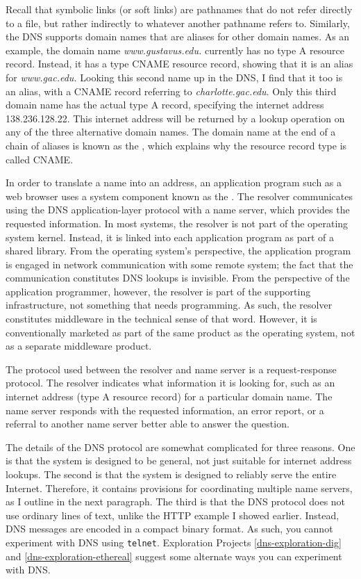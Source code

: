 Recall that symbolic links (or soft links) are pathnames that do not
refer directly to a file, but rather indirectly to whatever another
pathname refers to.  Similarly, the DNS supports domain names that are
aliases for other domain names.  As an example, the domain name
\textit{www.gustavus.edu.} currently has no type A resource record.
Instead, it has a type CNAME resource record, showing that it is an
alias for \textit{www.gac.edu.}  Looking this second name up in the DNS,
I find that it too is an alias, with a CNAME record referring to
\textit{charlotte.gac.edu}.  Only this third domain name has the actual
type A record, specifying the internet address 138.236.128.22.
This internet address will be returned by a lookup operation on any of
the three alternative domain names.  The domain name at the end of a
chain of aliases is known as the ,
which explains why the resource record type is called CNAME.

In order to translate a name into an address, an application program
such as a web browser uses a system component known as the .
The resolver communicates using the DNS application-layer protocol
with a name server, which provides the requested information.  In most
systems, the resolver is not part of the operating system kernel.
Instead, it is linked into each application program as part of a
shared library.  From the operating system's perspective, the
application program is engaged in network communication with some
remote system; the fact that the communication constitutes DNS lookups
is invisible.  From the perspective of the application programmer,
however, the resolver is part of the supporting infrastructure, not
something that needs programming.  As such, the resolver constitutes
middleware in the technical sense of that word.  However, it is
conventionally marketed as part of the same product as the operating
system, not as a separate middleware product.

The protocol used between the resolver and name server is a
request-response protocol.  The resolver indicates what information it
is looking for, such as an internet address (type A resource record)
for a particular domain name.  The name server responds with the
requested information, an error report, or a referral to another name
server better able to answer the question.

The details of the DNS protocol are somewhat complicated for three
reasons.  One is that the system is designed to be general, not just
suitable for internet address lookups.  The second is that the system
is designed to reliably serve the entire Internet.  Therefore, it
contains provisions for coordinating multiple name servers, as I
outline in the next paragraph.  The third is that the DNS protocol
does not use ordinary lines of text, unlike the HTTP example I showed
earlier.  Instead, DNS messages are encoded in a compact binary
format.  As such, you cannot experiment with DNS using \verb|telnet|.
Exploration Projects \ref{dns-exploration-dig} and
\ref{dns-exploration-ethereal} suggest some alternate ways you can
experiment with DNS.

